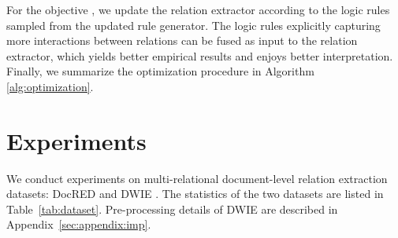 \documentclass[11pt]{article}
\begin{document}
For the objective , we update the relation extractor according to the logic rules sampled from the updated rule generator. 
The logic rules explicitly capturing more interactions between relations can be fused as input to the relation extractor,
which yields better empirical results and enjoys better interpretation.
Finally, we summarize the optimization procedure in Algorithm \ref{alg:optimization}.










































































 
\section{Experiments}
\label{sec:exp}

We conduct experiments on multi-relational document-level relation extraction datasets: DocRED \cite{yao-etal-2019-docred} and DWIE \cite{zaporojets2020dwie}. The statistics of the two datasets are listed in Table~\ref{tab:dataset}. Pre-processing details of DWIE are described in Appendix~\ref{sec:appendix:imp}.
\end{document}
